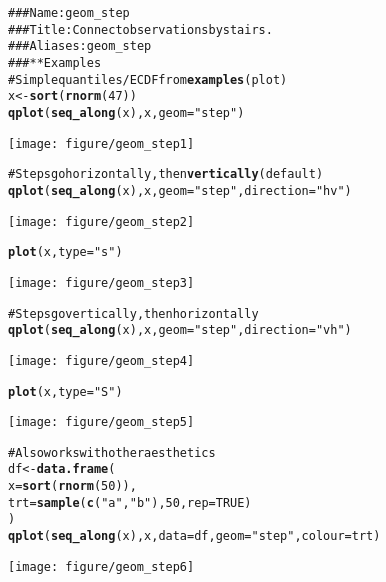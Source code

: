 \documentclass[a4paper,titlepage]{tufte-handout}\usepackage{graphicx, color}
\makeatletter
\def\maxwidth{ %
  \ifdim\Gin@nat@width>\linewidth
    \linewidth
  \else
    \Gin@nat@width
  \fi
}
\newcommand{\hlfunctioncall}[1]{\textcolor[rgb]{0.501960784313725,0,0.329411764705882}{\textbf{#1}}}%
\newcommand{\hlstring}[1]{\textcolor[rgb]{0.6,0.6,1}{#1}}%
\newcommand{\hlcomment}[1]{\textcolor[rgb]{0.180392156862745,0.6,0.341176470588235}{#1}}%
\newenvironment{kframe}{%
 \def\at@end@of@kframe{}%
 \ifinner\ifhmode%
  \def\at@end@of@kframe{\end{minipage}}%
  \begin{minipage}{\columnwidth}%
 \fi\fi%
 \def\FrameCommand##1{\hskip\@totalleftmargin \hskip-\fboxsep
 \colorbox{shadecolor}{##1}\hskip-\fboxsep
     \hskip-\linewidth \hskip-\@totalleftmargin \hskip\columnwidth}%
 \MakeFramed {\advance\hsize-\width
   \@totalleftmargin\z@ \linewidth\hsize
   \@setminipage}}%
 {\par\unskip\endMakeFramed%
 \at@end@of@kframe}
\newenvironment{knitrout}{}{} %
\makeatother
\begin{document}
\begin{knitrout}
\color{fgcolor}\begin{kframe}
\begin{alltt}
\hlcomment{### Name: geom_step}
\hlcomment{### Title: Connect observations by stairs.}
\hlcomment{### Aliases: geom_step}
\hlcomment{### ** Examples}
\hlcomment{# Simple quantiles/ECDF from \hlfunctioncall{examples}(plot)}
x <- \hlfunctioncall{sort}(\hlfunctioncall{rnorm}(47))
\hlfunctioncall{qplot}(\hlfunctioncall{seq_along}(x), x, geom=\hlstring{"step"})
\end{alltt}
\end{kframe}\texttt{[image: figure/geom\_step1]} \begin{kframe}\begin{alltt}
\hlcomment{# Steps go horizontally, then \hlfunctioncall{vertically} (default)}
\hlfunctioncall{qplot}(\hlfunctioncall{seq_along}(x), x, geom=\hlstring{"step"}, direction = \hlstring{"hv"})
\end{alltt}
\end{kframe}\texttt{[image: figure/geom\_step2]} \begin{kframe}\begin{alltt}
\hlfunctioncall{plot}(x, type = \hlstring{"s"})
\end{alltt}
\end{kframe}\texttt{[image: figure/geom\_step3]} \begin{kframe}\begin{alltt}
\hlcomment{# Steps go vertically, then horizontally}
\hlfunctioncall{qplot}(\hlfunctioncall{seq_along}(x), x, geom=\hlstring{"step"}, direction = \hlstring{"vh"})
\end{alltt}
\end{kframe}\texttt{[image: figure/geom\_step4]} \begin{kframe}\begin{alltt}
\hlfunctioncall{plot}(x, type = \hlstring{"S"})
\end{alltt}
\end{kframe}\texttt{[image: figure/geom\_step5]} \begin{kframe}\begin{alltt}
\hlcomment{# Also works with other aesthetics}
df <- \hlfunctioncall{data.frame}(
  x = \hlfunctioncall{sort}(\hlfunctioncall{rnorm}(50)),
  trt = \hlfunctioncall{sample}(\hlfunctioncall{c}(\hlstring{"a"}, \hlstring{"b"}), 50, rep = TRUE)
)
\hlfunctioncall{qplot}(\hlfunctioncall{seq_along}(x), x, data = df, geom=\hlstring{"step"}, colour = trt)
\end{alltt}
\end{kframe}\texttt{[image: figure/geom\_step6]} 
\end{knitrout}
\end{document}
